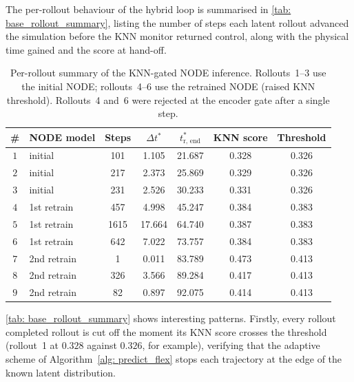 The per-rollout behaviour of the hybrid loop is summarised in \autoref{tab: base_rollout_summary}, listing the number of steps each latent rollout advanced the simulation before the KNN monitor returned control, along with the physical time gained and the score at hand-off.

\begin{table}[htb]
  \centering
  \begin{tabular}{
    c
    l
    S[table-format=3.0]
    S[table-format=2.3]
    S[table-format=2.3]
    S[table-format=1.3]
    S[table-format=1.3]
  }
    \toprule
    {\#} & NODE model & {Steps} & {$\Delta t^*$} & {$t^*_\text{r, end}$} & {KNN score} & {Threshold} \\
    \midrule
    $1$ & initial     & 101  & 1.105 & 21.687 & 0.328 & 0.326 \\
    $2$ & initial     & 217  & 2.373 & 25.869 & 0.329 & 0.326 \\
    $3$ & initial     & 231  & 2.526 & 30.233 & 0.331 & 0.326  \\
    \hline
    $4$ & 1st retrain & 457  & 4.998 & 45.247 & 0.384 & 0.383 \\
    $5$ & 1st retrain & 1615 & 17.664 & 64.740 & 0.387 & 0.383 \\
    $6$ & 1st retrain & 642  & 7.022 & 73.757 & 0.384 & 0.383 \\
    \hline
    $7$ & 2nd retrain & 1    & 0.011 & 83.789 & 0.473 & 0.413 \\
    $8$ & 2nd retrain & 326  & 3.566 & 89.284 & 0.417 & 0.413 \\
    $9$ & 2nd retrain & 82   & 0.897 & 92.075 & 0.414 & 0.413 \\
    \bottomrule
  \end{tabular}
  \caption{Per-rollout summary of the KNN-gated NODE inference. Rollouts~1--3 use the initial NODE; rollouts~4--6 use the retrained NODE (raised KNN threshold). Rollouts~4 and~6 were rejected at the encoder gate after a single step.}
  \label{tab: base_rollout_summary}
\end{table}

\autoref{tab: base_rollout_summary} shows interesting patterns. Firstly, every rollout completed rollout is cut off the moment its KNN score crosses the threshold (rollout~1 at $0.328$ against $0.326$, for example), verifying that the adaptive scheme of Algorithm~\ref{alg: predict_flex} stops each trajectory at the edge of the known latent distribution. 

